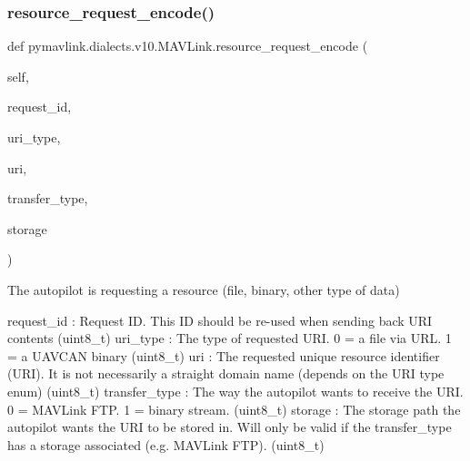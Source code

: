 \begin{DoxyVerb}
\begin{DoxyVerb}
\begin{DoxyVerb}
\begin{DoxyVerb}
\begin{DoxyVerb}
\begin{DoxyVerb}
\begin{DoxyVerb}
\begin{DoxyVerb}
\begin{DoxyVerb}
\begin{DoxyVerb}
\subsubsection{\texorpdfstring{resource\+\_\+request\+\_\+encode()}{resource\_request\_encode()}}
{\footnotesize\ttfamily def pymavlink.\+dialects.\+v10.\+M\+A\+V\+Link.\+resource\+\_\+request\+\_\+encode (\begin{DoxyParamCaption}\item[{}]{self,  }\item[{}]{request\+\_\+id,  }\item[{}]{uri\+\_\+type,  }\item[{}]{uri,  }\item[{}]{transfer\+\_\+type,  }\item[{}]{storage }\end{DoxyParamCaption})}

\begin{DoxyVerb}The autopilot is requesting a resource (file, binary, other type of
data)

request_id                : Request ID. This ID should be re-used when sending back URI contents (uint8_t)
uri_type                  : The type of requested URI. 0 = a file via URL. 1 = a UAVCAN binary (uint8_t)
uri                       : The requested unique resource identifier (URI). It is not necessarily a straight domain name (depends on the URI type enum) (uint8_t)
transfer_type             : The way the autopilot wants to receive the URI. 0 = MAVLink FTP. 1 = binary stream. (uint8_t)
storage                   : The storage path the autopilot wants the URI to be stored in. Will only be valid if the transfer_type has a storage associated (e.g. MAVLink FTP). (uint8_t)\end{DoxyVerb}
 \mbox{\label{classpymavlink_1_1dialects_1_1v10_1_1MAVLink_a586aeaaaa018697bc791ddbd8afdec04}} 

\end{DoxyVerb}
\end{DoxyVerb}
\end{DoxyVerb}
\end{DoxyVerb}
\end{DoxyVerb}
\end{DoxyVerb}
\end{DoxyVerb}
\end{DoxyVerb}
\end{DoxyVerb}
\end{DoxyVerb}
